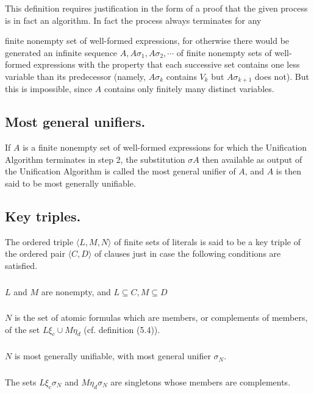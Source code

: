 \documentclass[8pt]{extarticle}
\begin{document}
This definition requires justification in the form of a proof that the given
process is in fact an algorithm. In fact the process always terminates for any

\newpage

finite nonempty set of well-formed expressions, for otherwise there would be
generated an infinite sequence $A, A\sigma_1,A\sigma_2,\dotsm$ of finite nonempty sets of well-formed expressions with the property that each successive set contains one less variable than its predecessor (namely, $A\sigma_k$ contains $V_k$ but $A\sigma_{k+1}$ does not). But this is impossible, since $A$ contains only finitely many distinct variables.

\subsection{Most general unifiers.}
If $A$ is a finite nonempty set of well-formed expressions for which the Unification Algorithm terminates in step 2, the substitution $\sigma A$ then available as output of the Unification Algorithm is called the most
general unifier of $A$, and $A$ is then said to be most generally unifiable.

\subsection{Key triples.}
The ordered triple $\langle L, M, N \rangle$ of finite sets of literals is said
to be a key triple of the ordered pair $\langle C,D\rangle$ of clauses just in case the following conditions are satisfied.

\subsubsection{}
$L$ and $M$ are nonempty, and $L \subseteq C, M \subseteq D$
\subsubsection{}
$N$ is the set of atomic formulas which are members, or complements
of members, of the set $L\xi_c\cup M\eta_d$ (cf. definition (5.4)).
\subsubsection{}
$N$ is most generally unifiable, with most general unifier $\sigma _N$.
\subsubsection{}
The sets $L\xi_c\sigma_N$ and $M\eta_d\sigma_N$ are singletons whose members are complements.
\end{document}
